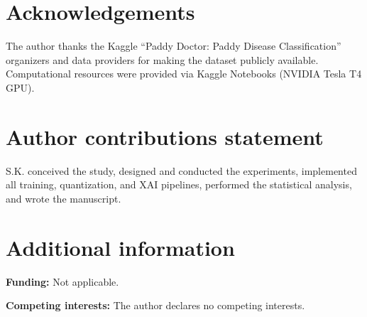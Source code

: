 \documentclass[fleqn,10pt]{wlscirep}
\begin{document}
\section*{Acknowledgements}

The author thanks the Kaggle ``Paddy Doctor: Paddy Disease Classification'' organizers and data providers for making the dataset publicly available. Computational resources were provided via Kaggle Notebooks (NVIDIA Tesla T4 GPU).


\section*{Author contributions statement}

S.K. conceived the study, designed and conducted the experiments, implemented all training, quantization, and XAI pipelines, performed the statistical analysis, and wrote the manuscript.


\section*{Additional information}

\textbf{Funding:} Not applicable.

\textbf{Competing interests:} The author declares no competing interests.



\end{document}
